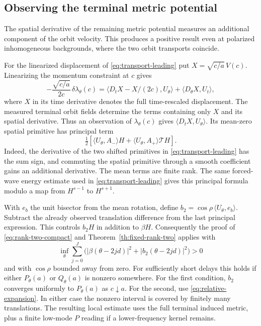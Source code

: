 \subsection{Observing the terminal metric potential}
\label{sec:metric-positive}
The spatial derivative of the remaining metric potential
measures an additional component of the orbit velocity.
This produces a positive result even at polarized
inhomogeneous backgrounds, where the two orbit transports
coincide.

For the linearized displacement of
\eqref{eq:transport-leading} put $X=\sqrt{c/a}\,V(c)$.
Linearizing the momentum constraint at $c$ gives
\[
 -\frac{\sqrt{c/a}}{2c}\,\delta\lambda_\theta(c)
  =\langle D_t X-X/(2c),U_\theta\rangle
   +\langle D_\theta X,U_t\rangle ,
\]
where $X$ in its time derivative denotes the full
time-rescaled displacement. The measured terminal orbit
fields determine the terms containing only $X$ and
its spatial derivative. Thus an observation of
$\lambda_\theta(c)$ gives $\langle D_tX,U_\theta\rangle$.
Its mean-zero spatial primitive has principal term
\[
 \tfrac12\left[\langle U_\theta,A_-\rangle H+
                    \langle U_\theta,A_+\rangle\mathcal T H\right].
\]
Indeed, the derivative of the two shifted primitives
in \eqref{eq:transport-leading} has the sum sign,
and commuting the spatial primitive through a smooth
coefficient gains an additional derivative.
The mean terms are finite rank.
The same forced-wave energy estimate used in
\eqref{eq:transport-leading} gives this principal
formula modulo a map from $H^{s-1}$ to $H^{s+1}$.

With $e_b$ the unit bisector from the mean rotation,
define $b_2=\cos\rho\,\langle U_\theta,e_b\rangle$.
Subtract the already observed translation difference
from the last principal expression. This controls
$b_2H$ in addition to $\beta H$.
Consequently the proof of
\eqref{eq:rank-two-compact} and
Theorem~\ref{th:fixed-rank-two} applies with
\[
 \inf_\theta\sum_{j=0}^{J}
  \big(|\beta(\theta-2jd)|^2+|b_2(\theta-2jd)|^2\big)>0
\]
and with $\cos\rho$ bounded away from zero.
For sufficiently short delays this holds if either
$P_\theta(a)$ or $Q_\theta(a)$ is nonzero somewhere.
For the first condition, $b_2$ converges uniformly to
$P_\theta(a)$ as $c\downarrow a$.
For the second, use \eqref{eq:relative-expansion}.
In either case the nonzero interval is covered by
finitely many translations. The resulting local estimate
uses the full terminal induced metric, plus a finite
low-mode $P$ reading if a lower-frequency kernel remains.

